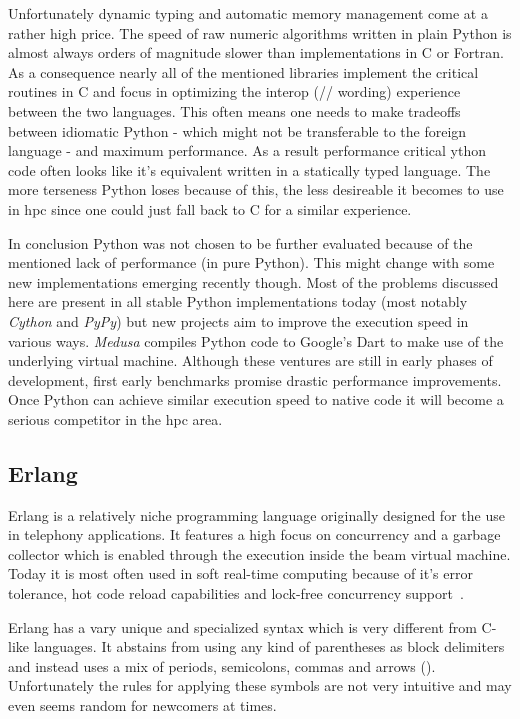 Unfortunately dynamic typing and automatic memory management come at a rather high price. The speed of raw numeric algorithms written in plain Python is almost always orders of magnitude slower than implementations in C or Fortran. As a consequence nearly all of the mentioned libraries implement the critical routines in C and focus in optimizing the interop (// wording) experience between the two languages. This often means one needs to make tradeoffs between idiomatic Python - which might not be transferable to the foreign language - and maximum performance. As a result performance critical ython code often looks like it's equivalent written in a statically typed language. The more terseness Python loses because of this, the less desireable it becomes to use in \gls{hpc} since one could just fall back to C for a similar experience.

In conclusion Python was not chosen to be further evaluated because of the mentioned lack of performance (in pure Python). This might change with some new implementations emerging recently though. Most of the problems discussed here are present in all stable Python implementations today (most notably \textit{Cython} and \textit{PyPy}) but new projects aim to improve the execution speed in various ways. \textit{Medusa} compiles Python code to Google's Dart to make use of the underlying virtual machine. Although these ventures are still in early phases of development, first early benchmarks promise drastic performance improvements. Once Python can achieve similar execution speed to native code it will become a serious competitor in the \gls{hpc} area.

\subsection*{Erlang}
\label{subsec:State_of_the_art::Candidates::Erlang}

Erlang is a relatively niche programming language originally designed for the use in telephony applications. It features a high focus on concurrency and a garbage collector which is enabled through the execution inside the \gls{beam} virtual machine. Today it is most often used in soft real-time computing because of it's error tolerance, hot code reload capabilities and lock-free concurrency support~\cite{intro_erlang}.

Erlang has a vary unique and specialized syntax which is very different from C-like languages. It abstains from using any kind of parentheses as block delimiters and instead uses a mix of periods, semicolons, commas and arrows (\mdinline{->}). Unfortunately the rules for applying these symbols are not very intuitive and may even seems random for newcomers at times.

